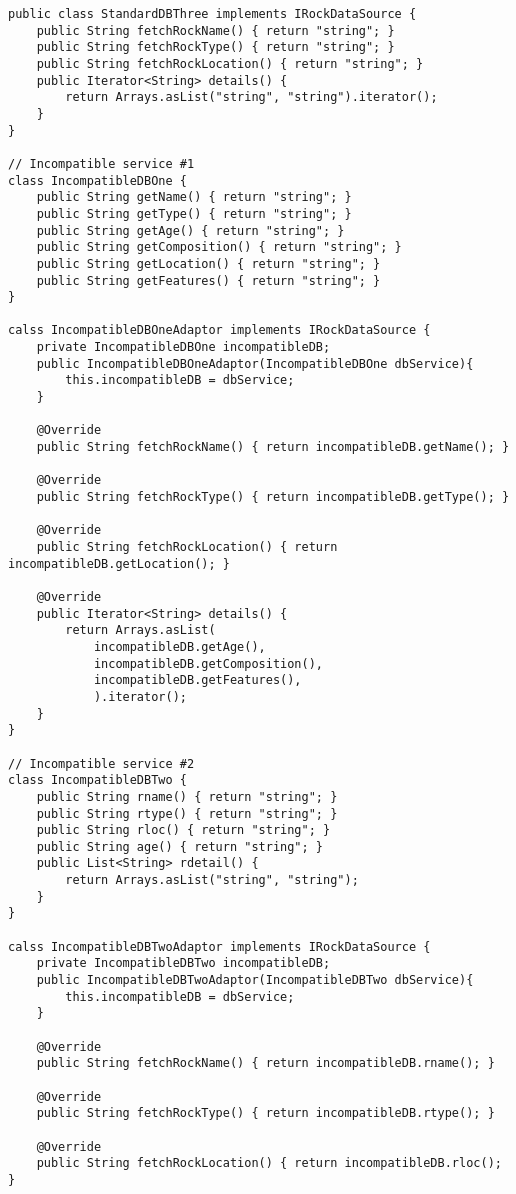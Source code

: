 \begin{enumerate}
\begin{verbatim}
public class StandardDBThree implements IRockDataSource {
    public String fetchRockName() { return "string"; }
    public String fetchRockType() { return "string"; }
    public String fetchRockLocation() { return "string"; }
    public Iterator<String> details() {
        return Arrays.asList("string", "string").iterator();
    }
}

// Incompatible service #1
class IncompatibleDBOne {
    public String getName() { return "string"; }
    public String getType() { return "string"; }
    public String getAge() { return "string"; }
    public String getComposition() { return "string"; }
    public String getLocation() { return "string"; }
    public String getFeatures() { return "string"; }
}

calss IncompatibleDBOneAdaptor implements IRockDataSource {
    private IncompatibleDBOne incompatibleDB;
    public IncompatibleDBOneAdaptor(IncompatibleDBOne dbService){
        this.incompatibleDB = dbService;
    }

    @Override
    public String fetchRockName() { return incompatibleDB.getName(); }

    @Override
    public String fetchRockType() { return incompatibleDB.getType(); }

    @Override
    public String fetchRockLocation() { return incompatibleDB.getLocation(); }

    @Override
    public Iterator<String> details() {
        return Arrays.asList(
            incompatibleDB.getAge(), 
            incompatibleDB.getComposition(), 
            incompatibleDB.getFeatures(), 
            ).iterator();
    }
}

// Incompatible service #2
class IncompatibleDBTwo {
    public String rname() { return "string"; }
    public String rtype() { return "string"; }
    public String rloc() { return "string"; }
    public String age() { return "string"; }
    public List<String> rdetail() {
        return Arrays.asList("string", "string");
    }
}

calss IncompatibleDBTwoAdaptor implements IRockDataSource {
    private IncompatibleDBTwo incompatibleDB;
    public IncompatibleDBTwoAdaptor(IncompatibleDBTwo dbService){
        this.incompatibleDB = dbService;
    }

    @Override
    public String fetchRockName() { return incompatibleDB.rname(); }

    @Override
    public String fetchRockType() { return incompatibleDB.rtype(); }

    @Override
    public String fetchRockLocation() { return incompatibleDB.rloc(); }


\end{verbatim}
\end{enumerate}
